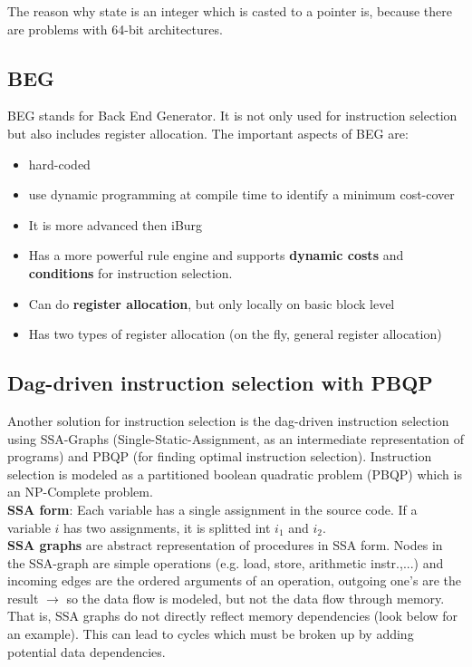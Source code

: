 \documentclass[a4paper,10pt]{article}
\begin{document}
The reason why state is an integer which is casted to a pointer is, because there are problems with 64-bit architectures.

\subsection{BEG}
BEG stands for Back End Generator. It is not only used for instruction selection but also includes register allocation. The important
aspects of BEG are:
\begin{itemize}
	\item hard-coded
    \item use dynamic programming at compile time to identify a minimum cost-cover
    \item It is more advanced then iBurg
    \item Has a more powerful rule engine and supports \textbf{dynamic costs} and \textbf{conditions} for instruction selection.
    \item Can do \textbf{register allocation}, but only locally on basic block level
    \item Has two types of register allocation (on the fly, general register allocation)
\end{itemize}

\subsection{Dag-driven instruction selection with PBQP}
Another solution for instruction selection is the dag-driven instruction selection using SSA-Graphs (Single-Static-Assignment, as an intermediate representation of programs) and PBQP (for finding optimal instruction selection). Instruction selection is modeled as a partitioned boolean quadratic problem (PBQP) which is an NP-Complete problem.\\

\textbf{SSA form}: Each variable has a single assignment in the source code. If a variable $i$ has two assignments, it is splitted int $i_{1}$ and $i_{2}$.\\

\textbf{SSA graphs} are abstract representation of procedures in SSA form. Nodes in the SSA-graph are simple operations (e.g. load, store, arithmetic instr.,...) and incoming edges are the ordered arguments of an operation, outgoing one's are the result $\rightarrow$ so the data flow is modeled, but not the data flow through memory. That is, SSA graphs do not directly reflect memory dependencies (look below for an example). This can lead to cycles which must be broken up by adding potential data dependencies.\\
\end{document}
